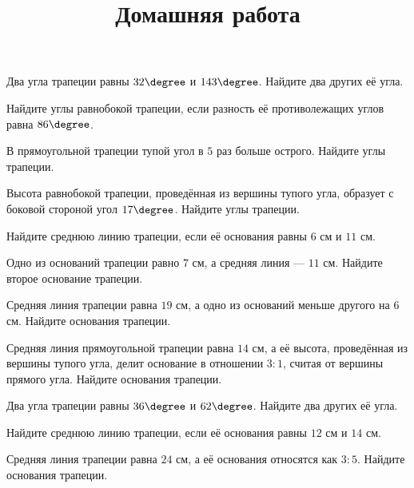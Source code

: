 %
%

\begin{class}[number=1]
	\begin{listofex}
		\item Два угла трапеции равны \( 32\degree \) и \( 143\degree \). Найдите два других её угла.
		\item Найдите углы равнобокой трапеции, если разность её противолежащих углов равна \( 86\degree \).
		\item В прямоугольной трапеции тупой угол в \( 5 \) раз больше острого. Найдите углы трапеции.
		\item Высота равнобокой трапеции, проведённая из вершины тупого угла, образует с боковой стороной угол \( 17\degree \). Найдите углы трапеции.
		\item Найдите среднюю линию трапеции, если её основания равны \( 6 \) см и \( 11 \) см.
		\item Одно из оснований трапеции равно \( 7 \) см, а средняя линия --- \( 11 \) см. Найдите второе основание трапеции.
		\item Средняя линия трапеции равна \( 19 \) см, а одно из оснований меньше другого на \( 6 \) см. Найдите основания трапеции.
		\item Средняя линия прямоугольной трапеции равна \( 14 \) см, а её высота, проведённая из вершины тупого угла, делит основание в отношении \( 3:1 \), считая от вершины прямого угла. Найдите основания трапеции.
	\end{listofex}
	\newpage
	\title{Домашняя работа}
	\begin{listofex}
		\item Два угла трапеции равны \( 36\degree \) и \( 62\degree \). Найдите два других её угла.
		\item Найдите среднюю линию трапеции, если её основания равны \( 12 \) см и \( 14 \) см.
		\item Средняя линия трапеции равна \( 24 \) см, а её основания относятся как \( 3:5 \). Найдите основания трапеции.
	\end{listofex}
\end{class}

